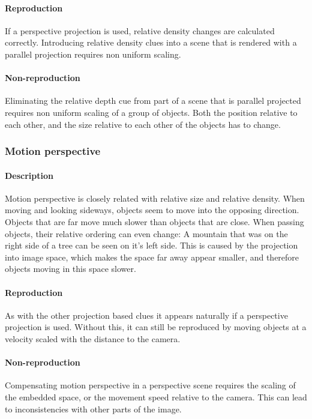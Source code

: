 \paragraph{Reproduction}
If a perspective projection is used, relative density changes are calculated correctly. Introducing relative density clues into a scene that is rendered with a parallel projection requires non uniform scaling.

\paragraph{Non-reproduction}
Eliminating the relative depth cue from part of a scene that is parallel projected requires non uniform scaling of a group of objects. Both the position relative to each other, and the size relative to each other of the objects has to change.


\subsubsection{Motion perspective}
\paragraph{Description}
Motion perspective is closely related with relative size and relative density. When moving and looking sideways, objects seem to move into the opposing direction. Objects that are far move much slower than objects that are close. When passing objects, their relative ordering can even change: A mountain that was on the right side of a tree can be seen on it's left side. This is caused by the projection into image space, which makes the space far away appear smaller, and therefore objects moving in this space slower.

\paragraph{Reproduction}
As with the other projection based clues it appears naturally if a perspective projection is used. Without this, it can still be reproduced by moving objects at a velocity scaled with the distance to the camera.

\paragraph{Non-reproduction}
Compensating motion perspective in a perspective scene requires the scaling of the embedded space, or the movement speed relative to the camera. This can lead to inconsistencies with other parts of the image.


